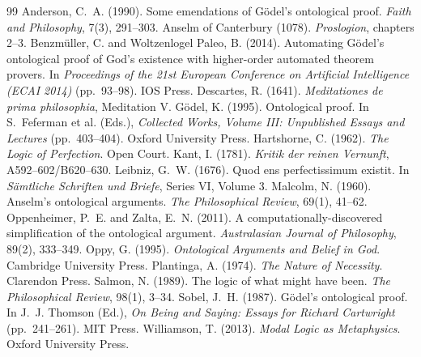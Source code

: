\documentclass{situationist-preprint}
\begin{document}
\begin{thebibliography}{99}\small
{} Anderson, C.~A. (1990). Some emendations of Gödel's ontological proof. \emph{Faith and Philosophy}, 7(3), 291--303.
 Anselm of Canterbury (1078). \emph{Proslogion}, chapters 2--3.
 Benzmüller, C. and Woltzenlogel Paleo, B. (2014). Automating Gödel's ontological proof of God's existence with higher-order automated theorem provers. In \emph{Proceedings of the 21st European Conference on Artificial Intelligence (ECAI 2014)} (pp.~93--98). IOS Press.
 Descartes, R. (1641). \emph{Meditationes de prima philosophia}, Meditation V.
 Gödel, K. (1995). Ontological proof. In S.~Feferman et al. (Eds.), \emph{Collected Works, Volume III: Unpublished Essays and Lectures} (pp.~403--404). Oxford University Press.
 Hartshorne, C. (1962). \emph{The Logic of Perfection}. Open Court.
 Kant, I. (1781). \emph{Kritik der reinen Vernunft}, A592--602/B620--630.
 Leibniz, G.~W. (1676). Quod ens perfectissimum existit. In \emph{Sämtliche Schriften und Briefe}, Series VI, Volume 3.
 Malcolm, N. (1960). Anselm's ontological arguments. \emph{The Philosophical Review}, 69(1), 41--62.
 Oppenheimer, P.~E. and Zalta, E.~N. (2011). A computationally-discovered simplification of the ontological argument. \emph{Australasian Journal of Philosophy}, 89(2), 333--349.
 Oppy, G. (1995). \emph{Ontological Arguments and Belief in God}. Cambridge University Press.
 Plantinga, A. (1974). \emph{The Nature of Necessity}. Clarendon Press.
 Salmon, N. (1989). The logic of what might have been. \emph{The Philosophical Review}, 98(1), 3--34.
 Sobel, J.~H. (1987). Gödel's ontological proof. In J.~J. Thomson (Ed.), \emph{On Being and Saying: Essays for Richard Cartwright} (pp.~241--261). MIT Press.
 Williamson, T. (2013). \emph{Modal Logic as Metaphysics}. Oxford University Press.
\end{thebibliography}
\end{document}
